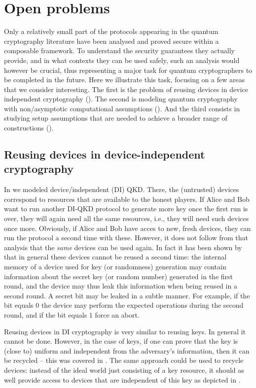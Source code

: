 \section{Open problems}
\label{sec:open}

Only a relatively small part of the protocols appearing in the quantum
cryptography literature have been analysed and proved secure within a
composable framework. To understand the security guarantees they
actually provide, and in what contexts they can be used safely, such
an analysis would however be crucial, thus representing a major task
for quantum cryptographers to be completed in the future. Here we
illustrate this task, focusing on a few areas that we consider
interesting. The first is the problem of reusing devices in device
independent cryptography (). The second is
modeling quantum cryptography with non\-/asymptotic computational
assumptions (). And the third consists
in studying setup assumptions that are needed to achieve a broader
range of constructions ().

\subsection{Reusing devices in device-independent cryptography}
\label{sec:open.di}


In  we modeled device\-/independent
(DI) QKD. There, the (untrusted) devices correspond to resources that
are available to the honest players. If Alice and Bob want to run
another DI-QKD protocol to generate more key once the first run is
over, they will again need all the same resources, i.e., they will
need such devices once more. Obviously, if Alice and Bob have acces to
new, fresh devices, they can run the protocol a second time with
these. However, it does not follow from that analysis that the
\emph{same} devices can be used again. In fact it has been shown by
\textcite{BCK13} that in general these devices cannot be reused a
second time: the internal memory of a device used for key (or randomness) generation may contain
information about the secret key (or random number) generated in the
first round, and the device may thus leak this information when being
reused in a second round. A secret bit may be leaked in a subtle manner.  For example, if the bit equals $0$ the device may perform the expected operations during the second round, and if the bit equals $1$ force an abort. 

Reusing devices in DI cryptography is very similar to reusing keys. In
general it cannot be done. However, in the case of keys, if one can
prove that the key is (close to) uniform and independent from the
adversary's information, then it can be recycled \--- this was covered
in . The same approach could be used to recycle
devices: instead of the ideal world just consisting of a key resource,
it should as well provide access to devices that are independent of
this key as depicted in .

